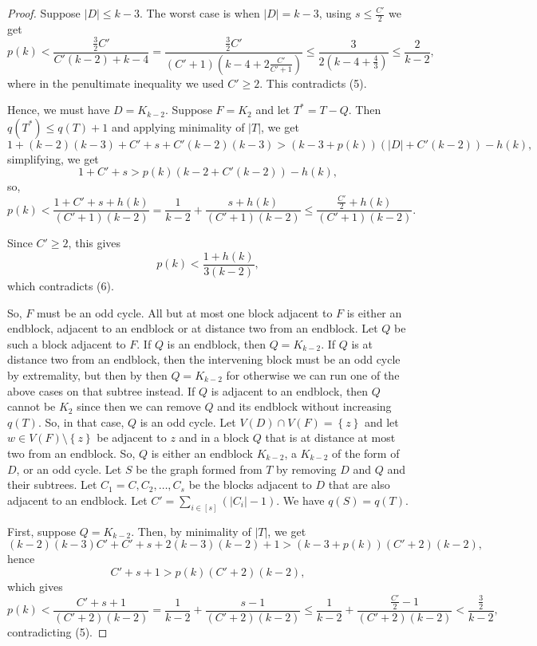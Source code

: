 \documentclass[12pt]{article}
\theoremstyle{plain}
\theoremstyle{definition}
\theoremstyle{remark}
\newcommand{\set}[1]{\left\{ #1 \right\}}
\newcommand{\card}[1]{\left|#1\right|}
\newcommand{\irange}[1]{\left[#1\right]}
\newcommand{\parens}[1]{\left( #1 \right)}
\begin{document}
\begin{proof}
		 Suppose $|D| \le k-3$.  The worst case is when $|D| = k-3$, using $s \le \frac{C'}{2}$ we get
		 \[p(k) < \frac{\frac32 C'}{C'(k-2) + k-4} = \frac{\frac32 C'}{\parens{C' + 1}\parens{k-4 + 2\frac{C'}{C'+1}}} \le \frac{3}{2(k-4 + \frac43)} \le \frac{2}{k-2},\]
		 where in the penultimate inequality we used $C' \ge 2$.  This contradicts (5).
		 
		 Hence, we must have $D = K_{k-2}$.  Suppose $F = K_2$ and let $T^*= T - Q$.  Then $q(T^*) \le q(T) + 1$ and applying minimality of $|T|$, we get
		 \[1 + (k-2)(k-3) + C' + s + C'(k-2)(k-3) > (k-3 + p(k))(\card{D} + C'(k-2)) - h(k) ,\]
		 simplifying, we get
		 \[1 + C' + s > p(k)(k-2 + C'(k-2)) - h(k) ,\]
		 so,
		 \[p(k) < \frac{1 + C' + s + h(k)}{(C' + 1)(k-2)} = \frac{1}{k-2} + \frac{s + h(k)}{(C' + 1)(k-2)} \le \frac{\frac{C'}{2} + h(k)}{(C' + 1)(k-2)}.\]
		 
		 Since $C' \ge 2$, this gives
		 \[p(k) < \frac{1 + h(k)}{3(k-2)},\]
		 which contradicts (6).  
		 
		 So, $F$ must be an odd cycle.  All but at most one block adjacent to $F$ is either an endblock, adjacent to an endblock or at distance two from an endblock.  Let $Q$ be such a block adjacent to $F$.  If $Q$ is an endblock, then $Q=K_{k-2}$.  If $Q$ is at distance two from an endblock, then the intervening block must be an odd cycle by extremality, but then by then $Q = K_{k-2}$ for otherwise we can run one of the above cases on that subtree instead. If $Q$ is adjacent to an endblock, then $Q$ cannot be $K_2$ since then we can remove $Q$ and its endblock without increasing $q(T)$.  So, in that case, $Q$ is an odd cycle. Let $V(D) \cap V(F) = \set{z}$ and let $w \in V(F) \setminus \set{z}$ be adjacent to $z$ and in a block $Q$ that is at distance at most two from an endblock.  So, $Q$ is either an endblock $K_{k-2}$, a $K_{k-2}$ of the form of $D$, or an odd cycle.  Let $S$ be the graph formed from $T$ by removing $D$ and $Q$ and their subtrees.   Let $C_1 = C, C_2, \ldots, C_s$ be the blocks adjacent to $D$ that are also adjacent to an endblock.  Let $C' = \sum_{i \in \irange{s}} \parens{\card{C_i} - 1}$. We have $q(S) = q(T)$. 
		 
		 First, suppose $Q = K_{k-2}$. Then, by minimality of $\card{T}$, we get
		 \[(k-2)(k-3)C' + C' + s + 2(k-3)(k-2) + 1 > (k-3 + p(k))(C'+2)(k-2),\]
		 hence
		 \[C' + s + 1 > p(k)(C'+2)(k-2),\]
		 which gives
		 \[p(k) < \frac{C' + s + 1}{(C'+2)(k-2)} = \frac{1}{k-2} + \frac{s-1}{(C'+2)(k-2)} \le \frac{1}{k-2} + \frac{\frac{C'}{2} - 1}{(C'+2)(k-2)} < \frac{\frac32}{k-2},\]
		 contradicting (5).
		 

\end{proof}
\end{document}
